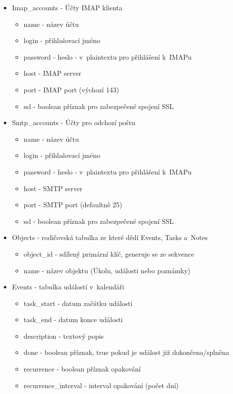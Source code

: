 \documentclass[bc,male,html,dept460]{diploma}				%
\begin{document}
\begin{itemize}
  \item Imap\_accounts - Účty IMAP klienta
    \begin{itemize}
      \item name - název účtu
      \item login - přihlašovací jméno
      \item password - heslo - v~plaintextu pro přihlášení k~IMAPu
      \item host - IMAP server
      \item port - IMAP port (výchozí 143)
      \item ssl - boolean příznak pro zabezpečené spojení SSL
    \end{itemize}

  \item Smtp\_accounts - Účty pro odchozí poštu
     \begin{itemize}
	\item name - název účtu
	\item login - přihlašovací jméno
	\item password - heslo - v~plaintextu pro přihlášení k~IMAPu
	\item host - SMTP server
	\item port - SMTP port (defaultně 25)
	\item ssl - boolean příznak pro zabezpečené spojení SSL
      \end{itemize}

  \item Objects - rodičovská tabulka ze které dědí Events, Tasks a~Notes
    \begin{itemize}
      \item object\_id - sdílený primární klíč, generuje se ze sekvence
      \item name - název objektu (Úkolu, události nebo poznámky)
    \end{itemize}

  \item Events - tabulka událostí v~kalendáři
      \begin{itemize}
	\item task\_start - datum začátku události
	\item task\_end - datum konce události
	\item description - textový popis
	\item done - boolean příznak, true pokud je událost již dokončena/splněna
	\item recurrence - boolean příznak opakování
	\item recurrence\_interval - interval opakování (počet dní)
      \end{itemize}
  

\end{itemize}
\end{document}
